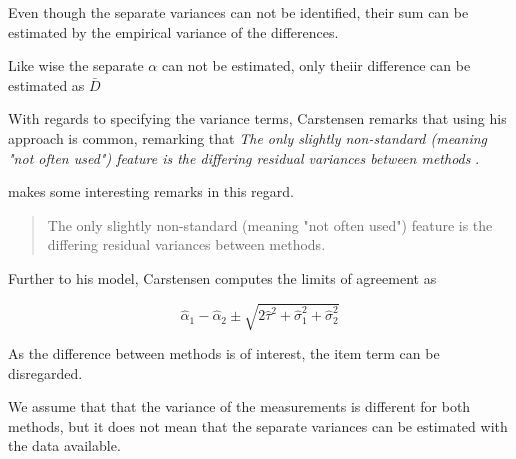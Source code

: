 \documentclass[12pt, a4paper]{report}
\theoremstyle{plain}
\theoremstyle{definition}
\theoremstyle{remark}
\begin{document}


\newpage
Even though the separate variances can not be identified, their sum can be estimated by the empirical variance of the differences.

Like wise the separate $\alpha$ can not be
estimated, only theiir difference can be estimated as
$\bar{D}$






With regards to specifying the variance terms, Carstensen remarks that using his approach is common, remarking that \emph{
	The only slightly non-standard (meaning "not often used") feature is the differing residual variances between methods }\citep{bxc2010}.

\citet{BXC2008} makes some interesting remarks in this regard.

\begin{quote}
	The only slightly non-standard (meaning "not often used") feature
	is the differing residual variances between methods.
\end{quote}

Further to his model, Carstensen computes the limits of agreement
as

\[
\hat{\alpha}_1 - \hat{\alpha}_2 \pm \sqrt{2 \hat{\tau}^2 +
	\hat{\sigma}^2_1 + \hat{\sigma}^2_2}
\]



As the difference between methods is of interest, the item term can be disregarded.

We assume that that the variance of the measurements is different for both methods, but it does not mean that the separate variances can be estimated with the data available.\\








\end{document}
